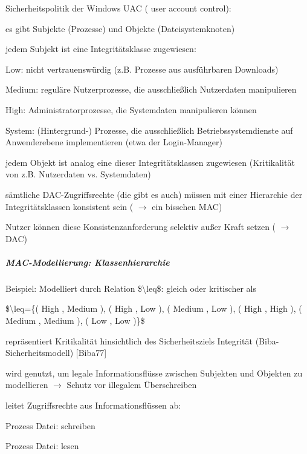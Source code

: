 \documentclass[a4paper]{article}
\begin{document}
\begin{multicols}{3}
    Sicherheitspolitik der Windows UAC ( user account control):

    \begin{itemize*}
        \item
        es gibt Subjekte (Prozesse) und Objekte (Dateisystemknoten)
        \item
        jedem Subjekt ist eine Integritätsklasse zugewiesen:
        \begin{itemize*}
            \item Low: nicht vertrauenswürdig (z.B. Prozesse aus ausführbaren Downloads)
            \item Medium: reguläre Nutzerprozesse, die ausschließlich Nutzerdaten manipulieren
            \item High: Administratorprozesse, die Systemdaten manipulieren können
            \item System: (Hintergrund-) Prozesse, die ausschließlich Betriebssystemdienste auf Anwenderebene implementieren (etwa der Login-Manager)
        \end{itemize*}
        \item
        jedem Objekt ist analog eine dieser Integritätsklassen zugewiesen
        (Kritikalität von z.B. Nutzerdaten vs. Systemdaten)
        \item
        sämtliche DAC-Zugriffsrechte (die gibt es auch) müssen mit einer
        Hierarchie der Integritätsklassen konsistent sein
        ( $\rightarrow$ ein bisschen MAC)
        \item
        Nutzer können diese Konsistenzanforderung selektiv außer Kraft setzen
        ( $\rightarrow$ DAC)
    \end{itemize*}


    \subparagraph{MAC-Modellierung:
        Klassenhierarchie}

    Beispiel: Modelliert durch Relation \$\textbackslash leq\$: gleich oder
    kritischer als

    \$\textbackslash leq=\{( High , Medium ), ( High , Low ), ( Medium , Low
    ), ( High , High ), ( Medium , Medium ), ( Low , Low )\}\$

    \begin{itemize*}
        \item
        repräsentiert Kritikalität hinsichtlich des Sicherheitsziels
        Integrität (Biba-Sicherheitsmodell) {[}Biba77{]}
        \item
        wird genutzt, um legale Informationsflüsse zwischen Subjekten und
        Objekten zu modellieren $\rightarrow$ Schutz vor
        illegalem Überschreiben
        \item
        leitet Zugriffsrechte aus Informationsflüssen ab:
        \begin{itemize*}
            \item Prozess Datei: schreiben
            \item Prozess Datei: lesen
        \end{itemize*}
    \end{itemize*}



\end{multicols}
\end{document}
